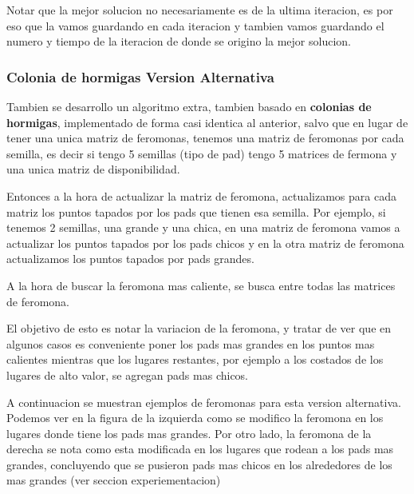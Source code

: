 Notar que la mejor solucion no necesariamente es de la ultima iteracion, es por eso que la vamos guardando en cada iteracion y tambien vamos guardando el numero y tiempo de la iteracion de donde se origino la mejor solucion.

\subsubsection{Colonia de hormigas Version Alternativa}

Tambien se desarrollo un algoritmo extra, tambien basado en \textbf{colonias de hormigas}, implementado de forma casi identica al anterior, salvo que en lugar de tener una unica matriz de feromonas, tenemos una matriz de feromonas por cada semilla, es decir si tengo 5 semillas (tipo de pad) tengo 5 matrices de fermona y una unica matriz de disponibilidad. 

Entonces a la hora de actualizar la matriz de feromona, actualizamos para cada matriz los puntos tapados por los pads que tienen esa semilla. Por ejemplo, si tenemos 2 semillas, una grande y una chica, en una matriz de feromona vamos a actualizar los puntos tapados por los pads chicos y en la otra matriz de feromona actualizamos los puntos tapados por pads grandes. 

A la hora de buscar la feromona mas caliente, se busca entre todas las matrices de feromona.

El objetivo de esto es notar la variacion de la feromona, y tratar de ver que en algunos casos es conveniente poner los pads mas grandes en los puntos mas calientes mientras que los lugares restantes, por ejemplo a los costados de los lugares de alto valor, se agregan pads mas chicos. 

A continuacion se muestran ejemplos de feromonas para esta version alternativa. Podemos ver en la figura de la izquierda como se modifico la feromona en los lugares donde tiene los pads mas grandes. Por otro lado, la feromona de la derecha se nota como esta modificada en los lugares que rodean a los pads mas grandes, concluyendo que se pusieron pads mas chicos en los alrededores de los mas grandes (ver seccion experiementacion)

